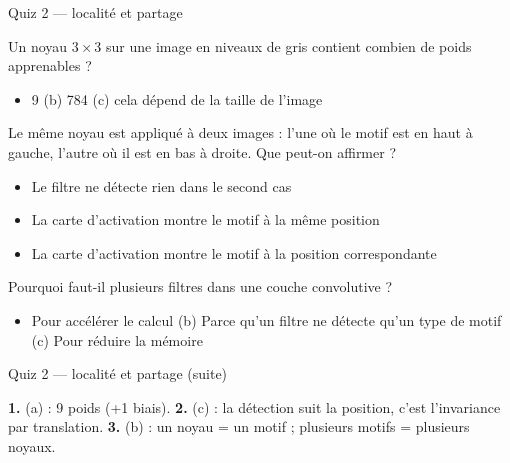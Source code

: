 \begin{frame}{Quiz 2 --- localité et partage}
\begin{qbox}[Question 1]
Un noyau $3 \times 3$ sur une image en niveaux de gris contient combien de poids
apprenables ?
\begin{itemize}
  \item[(a)] 9 \quad (b) 784 \quad (c) cela dépend de la taille de l'image
\end{itemize}
\end{qbox}
\begin{qbox}[Question 2]
Le même noyau est appliqué à deux images : l'une où le motif est en haut à gauche,
l'autre où il est en bas à droite. Que peut-on affirmer ?
\begin{itemize}
  \item[(a)] Le filtre ne détecte rien dans le second cas
  \item[(b)] La carte d'activation montre le motif à la même position
  \item[(c)] La carte d'activation montre le motif à la position correspondante
\end{itemize}
\end{qbox}
\begin{qbox}[Question 3]
Pourquoi faut-il plusieurs filtres dans une couche convolutive ?
\begin{itemize}
  \item[(a)] Pour accélérer le calcul \quad (b) Parce qu'un filtre ne détecte qu'un
  type de motif \quad (c) Pour réduire la mémoire
\end{itemize}
\end{qbox}

\end{frame}
\begin{frame}{Quiz 2 --- localité et partage (suite)}
\begin{solbox}[Réponses]
\textbf{1.} (a) : 9 poids (+1 biais). \quad
\textbf{2.} (c) : la détection suit la position, c'est l'invariance par translation.
\quad
\textbf{3.} (b) : un noyau = un motif ; plusieurs motifs = plusieurs noyaux.
\end{solbox}
\end{frame}

